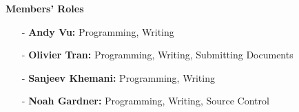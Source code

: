 \documentclass[sigplan,screen]{acmart}
\begin{document}
\textbf{Members' Roles}
\begin{itemize}
    \item[-] \textbf{Andy Vu:} Programming, Writing
    \item[-] \textbf{Olivier Tran:} Programming, Writing, \newline
        Submitting Documents
    \item[-] \textbf{Sanjeev Khemani:} Programming, Writing
    \item[-] \textbf{Noah Gardner:} Programming, Writing, \newline
        Source Control
\end{itemize}



\end{document}

